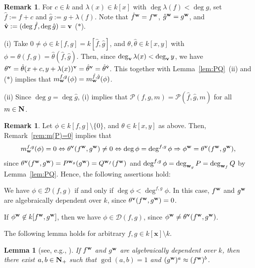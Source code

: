 \documentclass{amsart}
\theoremstyle{plain}
\newtheorem{lem}[thm]{Lemma}
\theoremstyle{definition}
\newtheorem{rem}[thm]{Remark}
\newcommand{\zs}{\{ 0\} }
\newcommand{\sm}{\setminus}
\newcommand{\nd}{\noindent}
\newcommand{\N}{{\bf N}}
\newcommand{\x}{{\boldsymbol x}}
\newcommand{\w}{{\bf w}}
\newcommand{\bv}{{\bf v}}
\newcommand{\kx}{k[\x]}
\newcommand{\degw  }{\deg}
\begin{document}
\begin{rem}\label{rem:PP}
For $c\in k$ and $\lambda (x)\in k[x]$ with $\deg \lambda (f)<\deg g$, 
set $\hat{f}:=f+c$ and $\hat{g}:=g+\lambda (f)$. 
Note that 
$\hat{f}^{\w }=f^{\w }$, $\hat{g}^{\w }=g^{\w }$, 
and $\hat{\bv }:=(\deg \hat{f},\deg \hat{g})=\bv $ ($*$). 



\nd (i) 
Take $0\ne \phi \in k[f,g]=k[\hat{f},\hat{g}]$, 
and $\theta ,\hat{\theta }\in k[x,y]$ 
with $\phi =\theta (f,g)=\hat{\theta }(\hat{f},\hat{g})$. 
Then, 
since $\deg _{\bv }\lambda (x)<\deg _{\bv }y$, 
we have $\theta ^{\bv }=\hat{\theta }(x+c,y+\lambda (x))^{\bv }
=\hat{\theta }^{\bv }=\hat{\theta }^{\hat{\bv }}$. 
This together with Lemma~\ref{lem:PQ}~(ii) and ($*$) implies that 
$m_{\w }^{f,g}(\phi )=m_{\w }^{\hat{f},\hat{g}}(\phi )$. 


\nd (ii) 
Since $\deg g=\deg \hat{g}$, 
(i) implies that 
$\mathcal{P}(f,g,m)=\mathcal{P}(\hat{f},\hat{g},m)$ 
for all $m\in \N $. 
\end{rem}





\begin{rem}\label{rem:(1.3.7)} 
Let $\phi \in k[f,g]\sm \zs $, 
and $\theta \in k[x,y]$ as above. 
Then, Remark~\ref{rem:m(P)=0} implies that 
\begin{equation}\label{eq:1.3.7}
m_{\w }^{f,g}(\phi )=0
\Leftrightarrow 
\theta ^{\bv }(f^{\w },g^{\w })\ne 0
\Leftrightarrow 
\deg \phi =\degw ^{f,g}\phi 
\Rightarrow 
\phi ^{\w }=\theta ^{\bv }(f^{\w },g^{\w }), 
\end{equation}
since 
$\theta ^{\bv }(f^{\w },g^{\w })=P^{\w _g}(g^{\w })=Q^{\w _f}(f^{\w })$ 
and $\degw ^{f,g}\phi =\deg _{\w _g}P=\deg _{\w _f}Q$ 
by Lemma~\ref{lem:PQ}. 
Hence, 
the following assertions hold: 



\nd{\rm (i)} 
We have $\phi \in \mathcal{D}(f,g)$ 
if and only if $\degw \phi <\degw ^{f,g}\phi $. 
In this case, 
$f^{\w }$ and $g^{\w }$ 
are algebraically dependent over $k$, 
since $\theta ^{\bv }(f^{\w },g^{\w })=0$. 


\nd{\rm (ii)} 
If $\phi ^{\w }\not\in k[f^{\w },g^{\w }]$, 
then we have $\phi \in \mathcal{D}(f,g)$, 
since $\phi ^{\w }\ne \theta ^{\bv }(f^{\w },g^{\w })$. 
\end{rem}


The following lemma holds for arbitrary $f,g\in \kx \sm k$. 


\begin{lem}[see, e.g., 
{\rm \cite[Proposition 1.1.4]{JC}}]\label{lem:dependence}
If $f^{\w }$ and $g^{\w }$ are algebraically dependent over $k$, 
then there exist $a,b\in \N _+$ such that 
$\gcd (a,b)=1$ and $(g^{\w })^a\approx (f^{\w })^b$. 
\end{lem}
\end{document}
